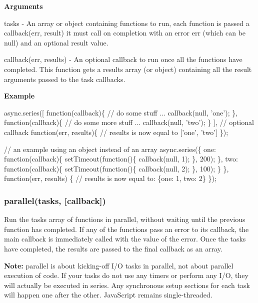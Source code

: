 {\bfseries Arguments}


\begin{DoxyItemize}
\item {\ttfamily tasks} -\/ An array or object containing functions to run, each function is passed a {\ttfamily callback(err, result)} it must call on completion with an error {\ttfamily err} (which can be {\ttfamily null}) and an optional {\ttfamily result} value.
\item {\ttfamily callback(err, results)} -\/ An optional callback to run once all the functions have completed. This function gets a results array (or object) containing all the result arguments passed to the {\ttfamily task} callbacks.
\end{DoxyItemize}

{\bfseries Example}


\begin{DoxyCode}
async.series([
    function(callback)\{
        // do some stuff ...
        callback(null, 'one');
    \},
    function(callback)\{
        // do some more stuff ...
        callback(null, 'two');
    \}
],
// optional callback
function(err, results)\{
    // results is now equal to ['one', 'two']
\});


// an example using an object instead of an array
async.series(\{
    one: function(callback)\{
        setTimeout(function()\{
            callback(null, 1);
        \}, 200);
    \},
    two: function(callback)\{
        setTimeout(function()\{
            callback(null, 2);
        \}, 100);
    \}
\},
function(err, results) \{
    // results is now equal to: \{one: 1, two: 2\}
\});
\end{DoxyCode}
 



\label{_parallel}%
 \subsubsection*{parallel(tasks, \mbox{[}callback\mbox{]})}

Run the {\ttfamily tasks} array of functions in parallel, without waiting until the previous function has completed. If any of the functions pass an error to its callback, the main {\ttfamily callback} is immediately called with the value of the error. Once the {\ttfamily tasks} have completed, the results are passed to the final {\ttfamily callback} as an array.

{\bfseries Note\+:} {\ttfamily parallel} is about kicking-\/off I/O tasks in parallel, not about parallel execution of code. If your tasks do not use any timers or perform any I/O, they will actually be executed in series. Any synchronous setup sections for each task will happen one after the other. Java\+Script remains single-\/threaded.

